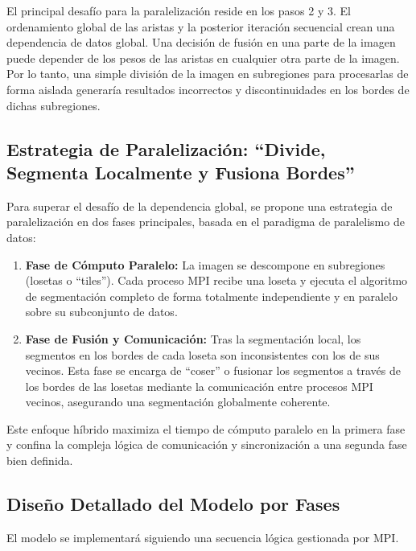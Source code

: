 \documentclass[fleqn,10pt]{article}
\begin{document}
El principal desafío para la paralelización reside en los pasos 2 y 3. El ordenamiento global de las aristas y la posterior iteración secuencial crean una dependencia de datos global. Una decisión de fusión en una parte de la imagen puede depender de los pesos de las aristas en cualquier otra parte de la imagen. Por lo tanto, una simple división de la imagen en subregiones para procesarlas de forma aislada generaría resultados incorrectos y discontinuidades en los bordes de dichas subregiones.

\subsection{Estrategia de Paralelización: ``Divide, Segmenta Localmente y Fusiona Bordes''}
Para superar el desafío de la dependencia global, se propone una estrategia de paralelización en dos fases principales, basada en el paradigma de paralelismo de datos:

\begin{enumerate}
    \item \textbf{Fase de Cómputo Paralelo:} La imagen se descompone en subregiones (losetas o ``tiles''). Cada proceso MPI recibe una loseta y ejecuta el algoritmo de segmentación completo de forma totalmente independiente y en paralelo sobre su subconjunto de datos.
    \item \textbf{Fase de Fusión y Comunicación:} Tras la segmentación local, los segmentos en los bordes de cada loseta son inconsistentes con los de sus vecinos. Esta fase se encarga de ``coser'' o fusionar los segmentos a través de los bordes de las losetas mediante la comunicación entre procesos MPI vecinos, asegurando una segmentación globalmente coherente.
\end{enumerate}

Este enfoque híbrido maximiza el tiempo de cómputo paralelo en la primera fase y confina la compleja lógica de comunicación y sincronización a una segunda fase bien definida.

\subsection{Diseño Detallado del Modelo por Fases}
El modelo se implementará siguiendo una secuencia lógica gestionada por MPI.
\end{document}
